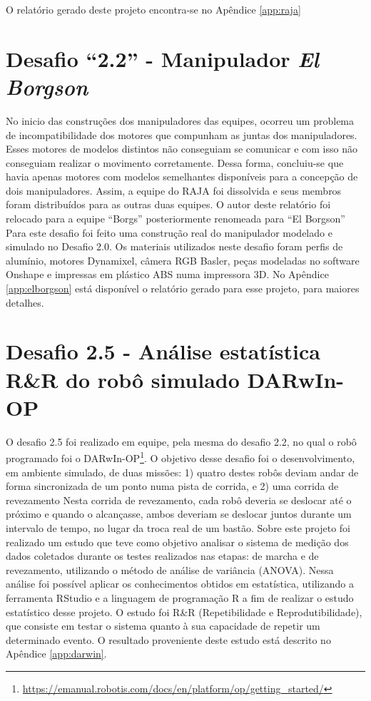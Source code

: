 O relatório gerado deste projeto encontra-se no Apêndice \ref{app:raja}


\section{Desafio ``2.2'' - Manipulador \textit{El Borgson}}

No inicio das construções dos manipuladores das equipes, ocorreu um problema de incompatibilidade dos motores que compunham as juntas dos manipuladores. Esses motores de modelos distintos não conseguiam se comunicar e com isso não conseguiam realizar o movimento corretamente. Dessa forma, concluiu-se que havia apenas motores com modelos semelhantes disponíveis para a concepção de dois manipuladores. Assim, a equipe do RAJA foi dissolvida e seus membros foram distribuídos para as outras duas equipes. O autor deste relatório foi relocado para a equipe ``Borgs'' posteriormente renomeada para ``El Borgson''
Para este desafio foi feito uma construção real do manipulador modelado e simulado
no Desafio 2.0. Os materiais utilizados neste desafio foram perfis de alumínio, motores Dynamixel, câmera RGB Basler, peças modeladas no software Onshape e impressas em plástico ABS numa impressora 3D. No Apêndice \ref{app:elborgson} está disponível o relatório gerado para esse projeto, para maiores detalhes.


\section{Desafio 2.5 - Análise estatística R\&R do robô simulado DARwIn-OP}

O desafio 2.5 foi realizado em equipe, pela mesma do desafio 2.2, no qual o robô programado
foi o DARwIn-OP\footnote{\url{https://emanual.robotis.com/docs/en/platform/op/getting\_started/}}. O objetivo desse desafio foi o desenvolvimento, em ambiente
simulado, de duas missões: 1) quatro destes robôs deviam andar de forma sincronizada de um ponto numa pista de corrida, e 2) uma corrida de revezamento
Nesta corrida de revezamento, cada robô deveria se deslocar até o próximo e quando o alcançasse, ambos deveriam se deslocar juntos durante um intervalo de tempo, no lugar da troca real de um bastão.
Sobre este projeto foi realizado um estudo que teve como objetivo analisar o sistema
de medição dos dados coletados durante os testes realizados nas etapas: de marcha e
de revezamento, utilizando o método de análise de variância (ANOVA). Nessa análise
foi possível aplicar os conhecimentos obtidos em estatística, utilizando a ferramenta RStudio e a linguagem de programação R a fim de realizar o estudo estatístico desse projeto. O estudo foi R\&R (Repetibilidade e Reprodutibilidade), que consiste em testar o sistema quanto à sua capacidade de repetir um determinado evento.
O resultado proveniente deste estudo está descrito no Apêndice \ref{app:darwin}.


